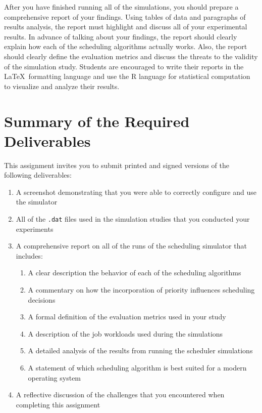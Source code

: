   After you have finished running all of the simulations, you should prepare a comprehensive report of your findings.
  Using tables of data and paragraphs of results analysis, the report must highlight and discuss all of your
  experimental results. In advance of talking about your findings, the report should clearly explain how each of the
  scheduling algorithms actually works. Also, the report should clearly define the evaluation metrics and discuss the
  threats to the validity of the simulation study. Students are encouraged to write their reports in the
  \LaTeX~formatting language and use the R language for statistical computation to visualize and analyze their results.

\section*{Summary of the Required Deliverables}

This assignment invites you to submit printed and signed versions of the following deliverables: 

\begin{enumerate}

  \itemsep0in

  \item A screenshot demonstrating that you were able to correctly configure and use the simulator

  \item All of the {\tt .dat} files used in the simulation studies that you conducted your experiments

  \item A comprehensive report on all of the runs of the scheduling simulator that includes:

  \begin{enumerate}

  \itemsep0in
    \item A clear description the behavior of each of the scheduling algorithms
    \item A commentary on how the incorporation of priority influences scheduling decisions
    \item A formal definition of the evaluation metrics used in your study
    \item A description of the job workloads used during the simulations
    \item A detailed analysis of the results from running the scheduler simulations
    \item A statement of which scheduling algorithm is best suited for a modern operating system

  \end{enumerate}

  \item A reflective discussion of the challenges that you encountered when completing this assignment

\end{enumerate}

